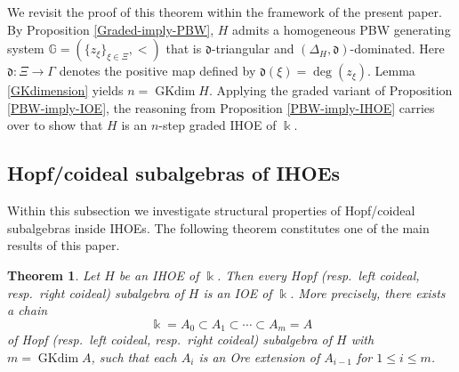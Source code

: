 \documentclass{article}
\makeatletter
\renewenvironment{proof}[1][\proofname]{\par
	\pushQED{\qed}%
	\normalfont \topsep6\p@\@plus6\p@\relax
	\trivlist
	\item[\hskip\labelsep
	\bfseries
	#1\@addpunct{.}]\ignorespaces
}{%
	\popQED\endtrivlist\@endpefalse
}
\theoremstyle{plain}
\newtheorem{thm}{Theorem}[section]
\theoremstyle{definition}
\numberwithin{equation}{section}
\DeclareMathOperator{\GKdim}{GKdim}
\newcommand{\GG}{\mathbb{G}}
\newcommand{\dd}{\mathfrak{d}}
\makeatother
\begin{document}
	\begin{proof}
		We revisit the proof of this theorem within the framework of the present paper. By Proposition \ref{Graded-imply-PBW}, $H$ admits a homogeneous PBW generating system $\GG=(\{z_{\xi}\}_{\xi\in \Xi}, <)$ that is $\dd$-triangular and $(\Delta_{H},\dd)$-dominated. Here $\dd\colon \Xi\to \Gamma$ denotes the positive map defined by $\dd(\xi) =\deg(z_{\xi})$. Lemma \ref{GKdimension} yields $n=\GKdim H$. Applying the graded variant of Proposition \ref{PBW-imply-IOE}, the reasoning from Proposition \ref{PBW-imply-IHOE} carries over to show that $H$ is an $n$-step graded IHOE of $\Bbbk$.
	\end{proof}
	
	\subsection{Hopf/coideal subalgebras of IHOEs}
	
	Within this subsection we investigate structural properties of Hopf/coideal subalgebras inside IHOEs. The following theorem constitutes one of the main results of this paper.
	
	\begin{thm}\label{Hopf-subalgebra-structure}
		Let $H$ be an IHOE of $\Bbbk$. Then every Hopf  (resp.\ left coideal, resp.\ right coideal) subalgebra of $H$ is an IOE of $\Bbbk$. More precisely, there exists a chain
		\[
		\Bbbk =A_{0} \subset A_{1} \subset \cdots \subset A_{m} =A
		\]
		of Hopf  (resp.\ left coideal, resp.\ right coideal) subalgebra of $H$ with $m=\operatorname{GKdim} A$, such that each $A_i$ is an Ore extension of $A_{i-1}$ for $1\le i\le m$.
	\end{thm}
	
\end{document}
